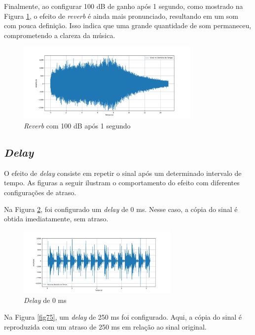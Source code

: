 Finalmente, ao configurar 100 dB de ganho após 1 segundo, como mostrado na Figura \ref{fig73}, o efeito de \textit{reverb} é ainda mais pronunciado, resultando em um som com pouca definição. Isso indica que uma grande quantidade de som permaneceu, comprometendo a clareza da música.

\begin{figure}[h]
    \centering
    \includegraphics[width=0.8\textwidth]{figuras/fig73.png}
    \caption{\textit{Reverb} com 100 dB após 1 segundo}
    \label{fig73}
\end{figure}

\subsection{\textit{Delay}}

O efeito de \textit{delay} consiste em repetir o sinal após um determinado intervalo de tempo. As figuras a seguir ilustram o comportamento do efeito com diferentes configurações de atraso.

Na Figura \ref{fig74}, foi configurado um \textit{delay} de 0 ms. Nesse caso, a cópia do sinal é obtida imediatamente, sem atraso.

\begin{figure}[h]
	\centering
    \includegraphics[width=0.7\textwidth]{figuras/fig74.png}
	\caption{\textit{Delay} de 0 ms}
	\label{fig74}
\end{figure}

Na Figura \ref{fig75}, um \textit{delay} de 250 ms foi configurado. Aqui, a cópia do sinal é reproduzida com um atraso de 250 ms em relação ao sinal original.

